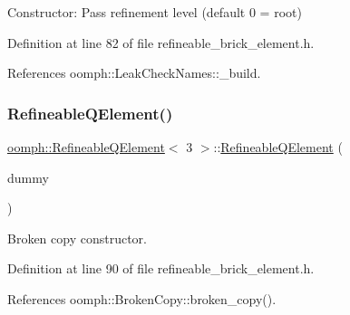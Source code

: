 Constructor\+: Pass refinement level (default 0 = root) 



Definition at line 82 of file refineable\+\_\+brick\+\_\+element.\+h.



References oomph\+::\+Leak\+Check\+Names\+::\+\_\+build.

\mbox{\label{classoomph_1_1RefineableQElement_3_013_01_4_a3357a1cd5bb746a97973ee6019e5bd04}} 
\subsubsection{\texorpdfstring{Refineable\+Q\+Element()}{RefineableQElement()}\hspace{0.1cm}{\footnotesize\ttfamily [2/2]}}
{\footnotesize\ttfamily \hyperlink{classoomph_1_1RefineableQElement}{oomph\+::\+Refineable\+Q\+Element}$<$ 3 $>$\+::\hyperlink{classoomph_1_1RefineableQElement}{Refineable\+Q\+Element} (\begin{DoxyParamCaption}\item[{const \hyperlink{classoomph_1_1RefineableQElement}{Refineable\+Q\+Element}$<$ 3 $>$ \&}]{dummy }\end{DoxyParamCaption})\hspace{0.3cm}{\ttfamily [inline]}}



Broken copy constructor. 



Definition at line 90 of file refineable\+\_\+brick\+\_\+element.\+h.



References oomph\+::\+Broken\+Copy\+::broken\+\_\+copy().

\mbox{\label{classoomph_1_1RefineableQElement_3_013_01_4_abbdc6a7895845fd7a30ecc5b35be2764}} 
